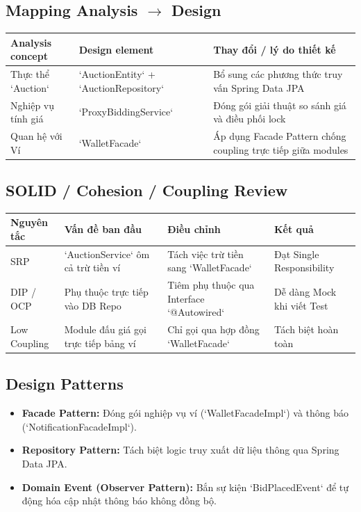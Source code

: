 \documentclass[11pt,a4paper]{article}
\begin{document}
\subsection{Mapping Analysis $\rightarrow$ Design}
\begin{table}[H]
    \centering
    \small
    \begin{tabularx}{\textwidth}{|l|l|X|}
        \hline
        \textbf{Analysis concept} & \textbf{Design element} & \textbf{Thay đổi / lý do thiết kế} \\ \hline
        Thực thể `Auction` & `AuctionEntity` + `AuctionRepository` & Bổ sung các phương thức truy vấn Spring Data JPA \\ \hline
        Nghiệp vụ tính giá & `ProxyBiddingService` & Đóng gói giải thuật so sánh giá và điều phối lock \\ \hline
        Quan hệ với Ví & `WalletFacade` & Áp dụng Facade Pattern chống coupling trực tiếp giữa modules \\ \hline
    \end{tabularx}
\end{table}

\subsection{SOLID / Cohesion / Coupling Review}
\begin{table}[H]
    \centering
    \small
    \begin{tabularx}{\textwidth}{|l|X|X|l|}
        \hline
        \textbf{Nguyên tắc} & \textbf{Vấn đề ban đầu} & \textbf{Điều chỉnh} & \textbf{Kết quả} \\ \hline
        SRP & `AuctionService` ôm cả trừ tiền ví & Tách việc trừ tiền sang `WalletFacade` & Đạt Single Responsibility \\ \hline
        DIP / OCP & Phụ thuộc trực tiếp vào DB Repo & Tiêm phụ thuộc qua Interface `@Autowired` & Dễ dàng Mock khi viết Test \\ \hline
        Low Coupling & Module đấu giá gọi trực tiếp bảng ví & Chỉ gọi qua hợp đồng `WalletFacade` & Tách biệt hoàn toàn \\ \hline
    \end{tabularx}
\end{table}

\subsection{Design Patterns}
\begin{itemize}[leftmargin=*]
    \item \textbf{Facade Pattern:} Đóng gói nghiệp vụ ví (`WalletFacadeImpl`) và thông báo (`NotificationFacadeImpl`).
    \item \textbf{Repository Pattern:} Tách biệt logic truy xuất dữ liệu thông qua Spring Data JPA.
    \item \textbf{Domain Event (Observer Pattern):} Bắn sự kiện `BidPlacedEvent` để tự động hóa cập nhật thông báo không đồng bộ.
\end{itemize}
\end{document}
